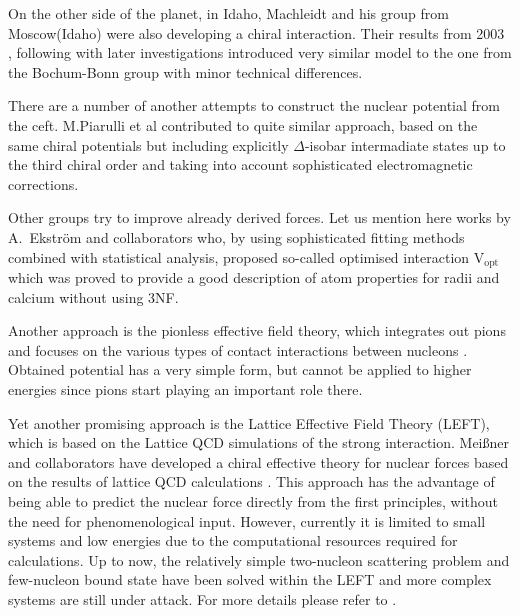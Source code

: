 On the other side of the planet, in Idaho, Machleidt and his group from Moscow(Idaho) were also developing 
a chiral interaction. Their results from 2003 \cite{Entem2003}, following with later 
investigations \cite{Machleidt2005, Machleidt2010, Entem2017} introduced very similar model
to the one from the Bochum-Bonn
group with minor technical differences.


There are a number of another attempts to construct the nuclear
potential from the \gls{ceft}.
M.Piarulli et al \cite{Piarulli2012,Piarulli2015} contributed
to quite similar approach, based on
the same chiral potentials but including explicitly 
$\Delta$-isobar intermadiate states 
up to the third chiral order and taking into account
sophisticated electromagnetic corrections.

Other groups try to improve already derived forces.
Let us mention here works by A.~Ekstr\"om and
collaborators \cite{ekstrom_2015, Tews_2020} who,
by using sophisticated fitting methods combined with
statistical analysis, proposed so-called optimised interaction
V$_\text{opt}$ which was proved to provide a good description
of atom properties for radii and calcium without
using 3NF.

Another approach is the pionless effective field
theory, which integrates out pions and
focuses on the various types of contact
interactions between nucleons \cite{hammer_review}.
Obtained potential has a very simple form, but cannot be applied
to higher energies since pions start playing an important role
there.

Yet another promising approach is the Lattice Effective Field Theory (LEFT), which
is based on the Lattice QCD simulations of the strong
interaction. Mei\ss{}ner and collaborators have developed a chiral effective
theory for nuclear forces based on the results of lattice QCD
calculations \cite{Lande2019}. This approach has the advantage of being able
to predict the nuclear force directly from the first
principles, without the need for phenomenological input. However, currently it is limited
to small systems and low energies due to the computational
resources required for calculations.
Up to now, the relatively simple two-nucleon scattering problem
and few-nucleon bound state
have been solved within the LEFT and more complex systems are
still under attack. 
For more details please refer to
\cite{Lande2019}.


